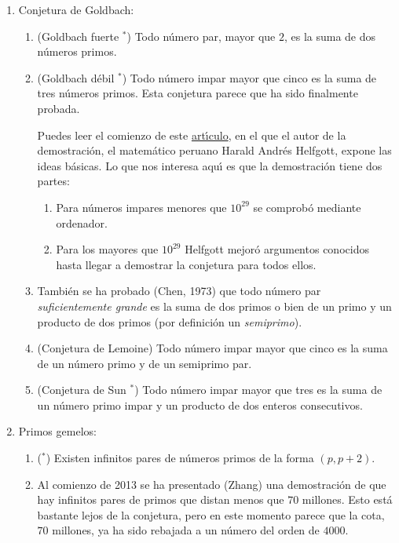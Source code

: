 \begin{enumerate}
 
 
 \item {\sc Conjetura de Goldbach}:
 
 \begin{enumerate}
 \item (Goldbach fuerte $^*$) Todo n\'umero par, mayor que $2$, es la suma de
dos
n\'umeros primos. 
 
 \item (Goldbach d\'ebil $^*$) Todo n\'umero impar mayor que cinco es la suma de
tres
n\'umeros primos. Esta conjetura parece que ha sido finalmente probada. 


Puedes leer el comienzo de este
\href{http://150.244.21.37/PDFs/TNUME/Harald.pdf}{art\'{\i}culo}, en el que el autor de la
demostraci\'on, el matem\'atico peruano 
Harald Andr\'es Helfgott, expone las ideas b\'asicas. Lo que nos interesa
aqu\'{\i} es que la demostraci\'on tiene dos partes:
\begin{enumerate}
\item Para n\'umeros impares menores que $10^{29}$ se comprob\'o mediante
ordenador.
\item Para los mayores que $10^{29}$ Helfgott mejor\'o  argumentos conocidos
hasta llegar a demostrar la conjetura para todos ellos.
\end{enumerate}
\item Tambi\'en se ha probado (Chen, 1973) que todo n\'umero par {\itshape
suficientemente grande} es la suma de dos primos o bien de un primo y un
producto de dos primos (por definici\'on un {\itshape semiprimo}).

\item (Conjetura de Lemoine)  Todo n\'umero impar mayor que cinco es la suma de
un n\'umero primo y 
de un semiprimo par.


\item (Conjetura de Sun $^*$) Todo n\'umero impar mayor que tres es la suma de
un
n\'umero primo impar 
y un producto de dos enteros consecutivos.

\end{enumerate}

\item {\sc Primos gemelos}:
 
 \begin{enumerate}
 \item ($^*$) Existen infinitos pares de n\'umeros primos de la forma $(p,p+2)$.
 
 \item Al comienzo de 2013 se ha presentado (Zhang)  una demostraci\'on de que
hay infinitos pares de primos que distan menos que $70$ millones. Esto est\'a
bastante lejos de la conjetura, pero en este momento parece que la cota, $70$
millones, ya ha sido rebajada a un n\'umero del orden de $4000.$
 

\end{enumerate}
\end{enumerate}
